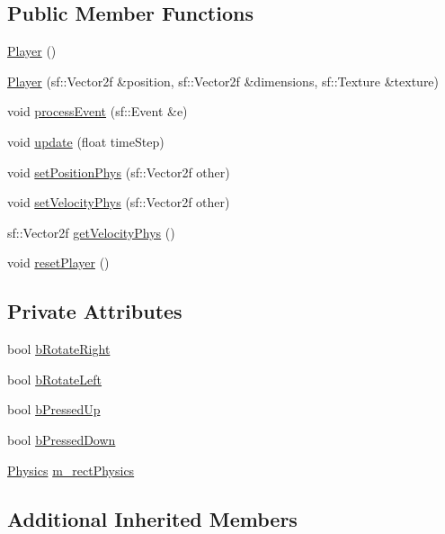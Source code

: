 \subsection*{Public Member Functions}
\begin{DoxyCompactItemize}
\item 
\hyperlink{class_player_affe0cc3cb714f6deb4e62f0c0d3f1fd8}{Player} ()
\item 
\hyperlink{class_player_af325f67103c14661d1dbc133bd066aad}{Player} (sf\+::\+Vector2f \&position, sf\+::\+Vector2f \&dimensions, sf\+::\+Texture \&texture)
\item 
void \hyperlink{class_player_a2adec8ca29f3ab52362174ccd1ed7d4d}{process\+Event} (sf\+::\+Event \&e)
\item 
void \hyperlink{class_player_a480140d0e89332be296673e63433c76a}{update} (float time\+Step)
\item 
void \hyperlink{class_player_afda87686c6028869242b8938fc98c936}{set\+Position\+Phys} (sf\+::\+Vector2f other)
\item 
void \hyperlink{class_player_ad0f9460e27f4d32e4326def511514688}{set\+Velocity\+Phys} (sf\+::\+Vector2f other)
\item 
sf\+::\+Vector2f \hyperlink{class_player_a2dbb7781b7ce5c32d3a0d0b4db2d2eb0}{get\+Velocity\+Phys} ()
\item 
void \hyperlink{class_player_a64f3efd0c43b7aa3138d532ff8dc615a}{reset\+Player} ()
\end{DoxyCompactItemize}
\subsection*{Private Attributes}
\begin{DoxyCompactItemize}
\item 
bool \hyperlink{class_player_ab898f2f67f989df21804ecb72f4d25b1}{b\+Rotate\+Right}
\item 
bool \hyperlink{class_player_ae2fd38e391d041ade292c8fd2a417f4f}{b\+Rotate\+Left}
\item 
bool \hyperlink{class_player_ad00b7a7e4920b62e13c152a2374c66dd}{b\+Pressed\+Up}
\item 
bool \hyperlink{class_player_aa195c952c7b5f09f59ed32935c8ed111}{b\+Pressed\+Down}
\item 
\hyperlink{class_physics}{Physics} \hyperlink{class_player_adc5a0f2ba8dd25317f817e4f65de9cae}{m\+\_\+rect\+Physics}
\end{DoxyCompactItemize}
\subsection*{Additional Inherited Members}


